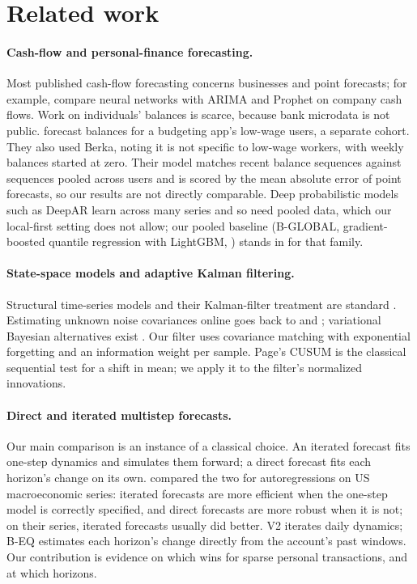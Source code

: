 \section{Related work}
\label{sec:related}

\paragraph{Cash-flow and personal-finance forecasting.} Most published
cash-flow forecasting concerns businesses and point forecasts; for example,
\citet{weytjens2021cashflow} compare neural networks with ARIMA and Prophet
on company cash flows. Work on individuals' balances is scarce, because bank microdata is not
public. \citet{zhang2018lowwage} forecast balances for a budgeting app's
low-wage users, a separate cohort. They also used Berka, noting it is not
specific to low-wage workers, with weekly balances started at zero. Their
model matches recent balance sequences against sequences pooled across
users and is scored by the mean absolute error of point forecasts, so our
results are not directly comparable. Deep probabilistic models such as DeepAR
\citep{salinas2020deepar} learn across many series and so need pooled data,
which our local-first setting does not allow; our pooled baseline
(B-GLOBAL, gradient-boosted quantile regression with LightGBM,
\citealp{ke2017lightgbm}) stands in for that family.

\paragraph{State-space models and adaptive Kalman filtering.} Structural
time-series models and their Kalman-filter treatment are standard
\citep{harvey1989,durbin2012}. Estimating unknown noise covariances
online goes back to \citet{mehra1970,mehra1972} and
\citet{myers1976}; variational Bayesian alternatives exist
\citep{sarkka2009vb}. Our filter uses covariance matching with
exponential forgetting and an information weight per sample. Page's CUSUM
\citep{page1954} is the classical sequential test for a shift in mean; we
apply it to the filter's normalized innovations.

\paragraph{Direct and iterated multistep forecasts.} Our main comparison
is an instance of a classical choice. An iterated forecast fits one-step
dynamics and simulates them forward; a direct forecast fits each horizon's
change on its own. \citet{marcellino2006direct} compared the two for
autoregressions on US macroeconomic series: iterated forecasts are more
efficient when the one-step model is correctly specified, and direct
forecasts are more robust when it is not; on their series, iterated
forecasts usually did better. V2 iterates daily dynamics;
B-EQ estimates each horizon's change directly from the account's past
windows. Our contribution is evidence on which wins for sparse personal
transactions, and at which horizons.

